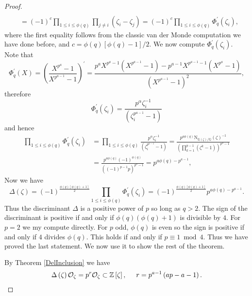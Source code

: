 \begin{proof}
$$\begin{aligned}
\\
&=\left( -1 \right) ^c\prod_{1\le i\le \phi \left( q \right)}{\prod_{j\ne i}{\left( \zeta _i-\zeta _j \right)}}=\left( -1 \right) ^c\prod_{1\le i\le \phi \left( q \right)}{\Phi _{q}^{\prime}\left( \zeta _i \right)},
\end{aligned}
$$
where the first equality follows from the classic van der Monde computation we have done before, and $c=\phi(q)[\phi(q)-1]/2$. We now compute $\Phi_q^\prime(\zeta_i)$. Note that 
$$
\Phi _{q}^{\prime}\left( X \right) =\left( \frac{X^{p^a}-1}{X^{p^{a-1}}-1} \right) ^{\prime}=\frac{p^aX^{p^a-1}\left( X^{p^{a-1}}-1 \right) -p^{a-1}X^{p^{a-1}-1}\left( X^{p^a}-1 \right)}{\left( X^{p^{a-1}}-1 \right) ^2},
$$
therefore 
$$
\Phi _{q}^{\prime}\left( \zeta _i \right) =\frac{p^{\alpha}\zeta _{i}^{-1}}{\left( \zeta _{i}^{p^{a-1}}-1 \right)}
$$
and hence 
$$
\begin{aligned}
\prod_{1\le i\le \phi \left( q \right)}{\Phi _{q}^{\prime}\left( \zeta _i \right)}&=\prod_{1\le i\le \phi \left( q \right)}{\frac{p^{\alpha}\zeta _{i}^{-1}}{\left( \zeta _{i}^{p^{a-1}}-1 \right)}}=\frac{p^{a\phi \left( q \right)}\mathrm{N}_{\mathbb{Q} \left( \zeta \right) /\mathbb{Q}}\left( \zeta \right) ^{-1}}{\left( \prod_{k=1}^{p-1}{\left( \zeta ^k-1 \right)} \right) ^{p^a-1}}
\\
&=\frac{p^{a\phi \left( q \right)}\left( -1 \right) ^{\phi \left( q \right)}}{\left( \left( -1 \right) ^{p-1}p \right) ^{p^a-1}}=p^{a\phi \left( q \right) -p^{a-1}},
\end{aligned}
$$
Now we have 
$$
\Delta \left( \zeta \right) =\left( -1 \right) ^{\frac{\phi \left( q \right) \left[ \phi \left( q \right) +1 \right]}{2}}\prod_{1\le i\le \phi \left( q \right)}{\Phi _{q}^{\prime}\left( \zeta _i \right)}=\left( -1 \right) ^{\frac{\phi \left( q \right) \left[ \phi \left( q \right) +1 \right]}{2}}p^{a\phi \left( q \right) -p^{a-1}}.
$$
Thus the discriminant $\Delta$ is a positive power of $p$ so long as $q>2$. The sign of the discriminant is positive if and only if $\phi(q)(\phi(q)+1)$ is divisible by $4$. For $p=2$ we my compute directly. For $p$ odd, $\phi(q)$ is even so the sign is positive if and only if $4$ divides $\phi(q)$. This holds if and only if $p\equiv 1\bmod{4}$. Thus we have proved the last statement. We now use it to show the rest of the theorem.\par
By Theorem \ref{DelInclusion} we have 
$$
\Delta \left( \zeta \right) \mathcal{O} _{\zeta}=p^r\mathcal{O} _{\zeta}\subset \mathbb{Z} \left[ \zeta \right] ,\hspace{0.5cm}r=p^{a-1}\left( ap-a-1 \right) .
$$
\end{proof}
